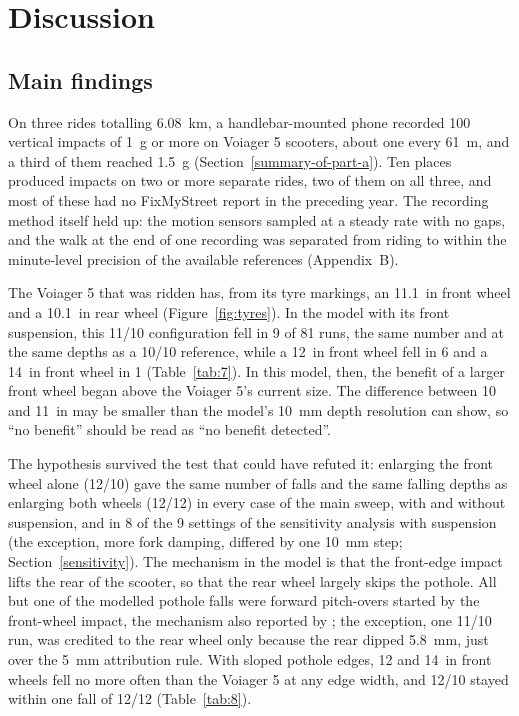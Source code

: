 \section{Discussion}\label{sec:discussion}

\subsection{Main findings}

On three rides totalling 6.08~km, a handlebar-mounted phone recorded 100 vertical impacts of
1~g or more on Voiager 5 scooters, about one every 61~m, and a third of them reached 1.5~g
(Section~\ref{summary-of-part-a}). Ten places produced impacts on two or more separate rides,
two of them on all three, and most of these had no FixMyStreet report in the preceding year.
The recording method itself held up: the motion sensors sampled at a steady rate with no
gaps, and the walk at the end of one recording was separated from riding to within the
minute-level precision of the available references (Appendix~B).

The Voiager 5 that was ridden has, from its tyre markings, an 11.1~in front wheel and a
10.1~in rear wheel (Figure~\ref{fig:tyres}). In the model with its front suspension, this
11/10 configuration fell in 9 of 81 runs, the same number and at the same depths as a
10/10 reference, while a 12~in front wheel fell in 6 and a 14~in front wheel in 1
(Table~\ref{tab:7}). In this model, then, the benefit of a larger front wheel began above the
Voiager 5's current size. The difference between 10 and 11~in may be smaller than the
model's 10~mm depth resolution can show, so ``no benefit'' should be read as ``no benefit
detected''.

The hypothesis survived the test that could have refuted it: enlarging the front wheel
alone (12/10) gave the same number of falls and the same falling depths as enlarging both
wheels (12/12) in every case of the main sweep, with and without suspension, and in 8 of
the 9 settings of the sensitivity analysis with suspension (the exception, more fork
damping, differed by one 10~mm step; Section~\ref{sensitivity}). The mechanism in the model
is that the front-edge impact lifts the rear of the scooter, so that the rear wheel largely
skips the pothole. All but one of the modelled pothole falls were forward pitch-overs
started by the front-wheel impact, the mechanism also reported by \textcite{posirisuk2022};
the exception, one 11/10 run, was credited to the rear wheel only because the rear dipped
5.8~mm, just over the 5~mm attribution rule. With sloped pothole edges, 12 and 14~in front
wheels fell no more often than the Voiager 5 at any edge width, and 12/10 stayed within one
fall of 12/12 (Table~\ref{tab:8}).

